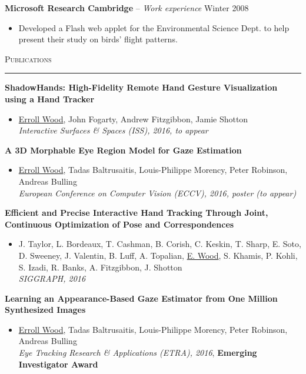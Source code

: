 \documentclass{article}
\begin{document}
\textbf{Microsoft Research Cambridge} -- \emph{Work experience} \hfill Winter 2008 \\[-6mm]
\begin{itemize}
  \item[] Developed a Flash web applet for the Environmental Science Dept. to help present their study on birds' flight patterns.
\end{itemize} \bigskip

\textsc{Publications} \smallskip \hrule \smallskip

\textbf{ShadowHands: High-Fidelity Remote Hand Gesture Visualization using a Hand Tracker} \\[-6mm]
\begin{itemize}
  \item[] \underline{Erroll Wood}, John Fogarty, Andrew Fitzgibbon, Jamie Shotton \\
  \emph{Interactive Surfaces \& Spaces (ISS), 2016, to appear}
\end{itemize} \smallskip

\pagebreak

\textbf{A 3D Morphable Eye Region Model for Gaze Estimation} \\[-6mm]
\begin{itemize}
  \item[] \underline{Erroll Wood}, Tadas Baltrusaitis, Louis-Philippe Morency, Peter Robinson, Andreas Bulling \\
  \emph{European Conference on Computer Vision (ECCV), 2016, poster (to appear)}
\end{itemize} \smallskip

\textbf{Efficient and Precise Interactive Hand Tracking Through Joint, Continuous Optimization of Pose and Correspondences} \\[-6mm]
\begin{itemize}
  \item[] J. Taylor, L. Bordeaux, T. Cashman, B. Corish, C. Keskin, T. Sharp, E. Soto, D. Sweeney, J. Valentin, B. Luff, A. Topalian, \underline{E. Wood}, S. Khamis, P. Kohli, S. Izadi, R. Banks, A. Fitzgibbon, J. Shotton \\
  \emph{SIGGRAPH, 2016}
\end{itemize} \smallskip

\textbf{Learning an Appearance-Based Gaze Estimator from One Million Synthesized Images} \\[-6mm]
\begin{itemize}
  \item[] \underline{Erroll Wood}, Tadas Baltrusaitis, Louis-Philippe Morency, Peter Robinson, Andreas Bulling \\
  \emph{Eye Tracking Research \& Applications (ETRA), 2016}, \textbf{Emerging Investigator Award}
\end{itemize} \smallskip
\end{document}

